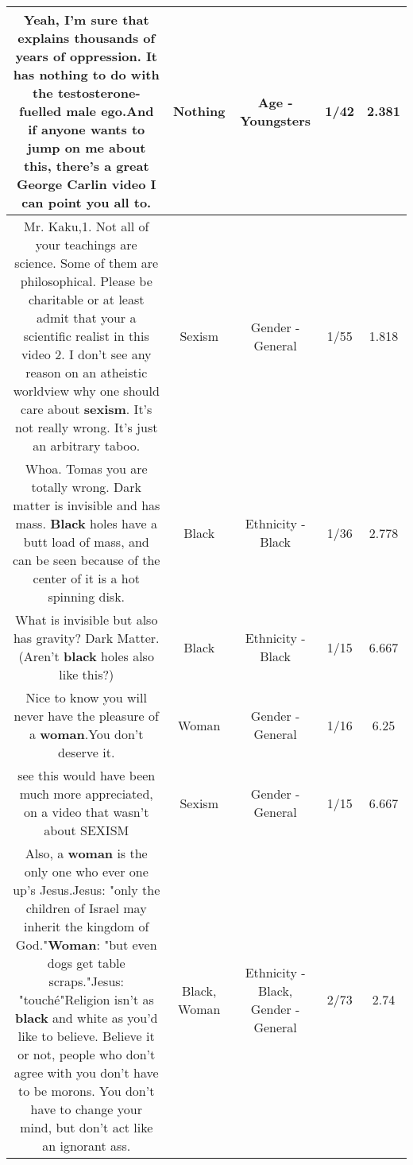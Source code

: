 \documentclass[11pt]{article}
\newlength\mylength
\begin{document}
\begin{center}
\begin{longtable}{|C{.65\mylength}|C{.30\mylength}|C{.12\mylength}|C{.12\mylength}|C{.12\mylength}|}
  \small Yeah, I'm sure that explains thousands of years of oppression. It has \textbf{nothing} to do with the testosterone-fuelled male ego.And if anyone wants to jump on me about this, there's a great George Carlin video I can point you all to.\normalsize   & Nothing & Age - Youngsters & 1/42 & 2.381 \\  \hline
  \small Mr. Kaku,1. Not all of your teachings are science. Some of them are philosophical. Please be charitable or at least admit that your a scientific realist in this video 2. I don't see any reason on an atheistic worldview why one should care about \textbf{sexism}. It's not really wrong. It's just an arbitrary taboo.\normalsize   & Sexism & Gender - General & 1/55 & 1.818 \\  \hline
  \small Whoa. Tomas you are totally wrong. Dark matter is invisible and has mass. \textbf{Black} holes have a butt load of mass, and can be seen because of the center of it is a hot spinning disk.\normalsize   & Black & Ethnicity - Black & 1/36 & 2.778 \\  \hline
  \small What is invisible but also has gravity? Dark Matter. (Aren't \textbf{black} holes also like this?)\normalsize   & Black & Ethnicity - Black & 1/15 & 6.667 \\  \hline
  \small Nice to know you will never have the pleasure of a \textbf{woman}.You don't deserve it.\normalsize   & Woman & Gender - General & 1/16 & 6.25 \\  \hline
  \small see this would have been much more appreciated, on a video that wasn't about SEXISM\normalsize   & Sexism & Gender - General & 1/15 & 6.667 \\  \hline
  \small Also, a \textbf{woman} is the only one who ever one up's Jesus.Jesus: "only the children of Israel may inherit the kingdom of God."\textbf{Woman}: "but even dogs get table scraps."Jesus: "touché"Religion isn't as \textbf{black} and white as you'd like to believe. Believe it or not, people who don't agree with you don't have to be morons. You don't have to change your mind, but don't act like an ignorant ass.\normalsize   & Black, Woman & Ethnicity - Black, Gender - General & 2/73 & 2.74 \\  \hline

\end{longtable}
\end{center}
\end{document}
